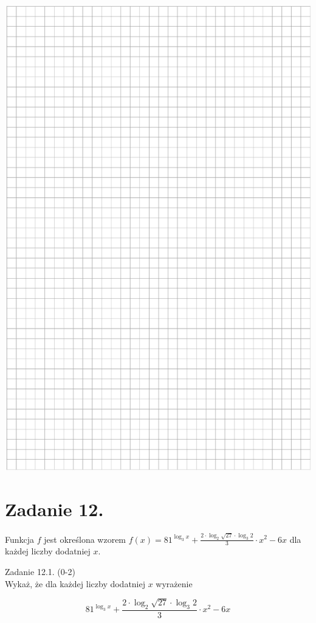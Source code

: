 \documentclass[10pt]{article}
\begin{document}
\includegraphics[max width=\textwidth, center]{2024_11_21_f1ecc00f5c4ab21f0d04g-19}

\section*{Zadanie 12.}
Funkcja \(f\) jest określona wzorem \(f(x)=81^{\log _{3} x}+\frac{2 \cdot \log _{2} \sqrt{27} \cdot \log _{3} 2}{3} \cdot x^{2}-6 x\) dla każdej liczby dodatniej \(x\).

Zadanie 12.1. (0-2)\\
Wykaż, że dla każdej liczby dodatniej \(x\) wyrażenie

\[
81^{\log _{3} x}+\frac{2 \cdot \log _{2} \sqrt{27} \cdot \log _{3} 2}{3} \cdot x^{2}-6 x
\]
\end{document}
